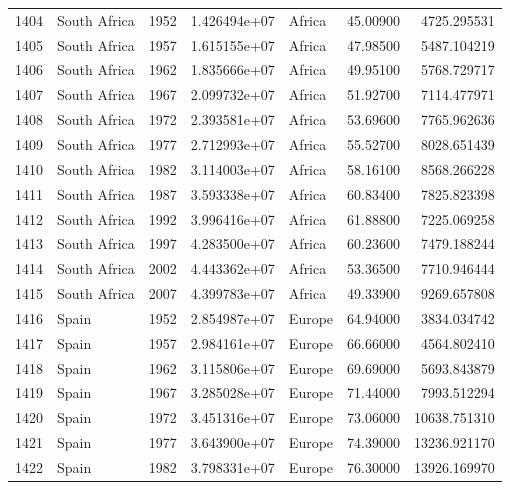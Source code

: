 \documentclass[
  letterpaper,
  DIV=11,
  numbers=noendperiod]{scrreprt}
\begin{document}
\begin{tabular}{llrrlrr}
1404 &              South Africa &  1952 &  1.426494e+07 &    Africa &  45.00900 &    4725.295531 \\
1405 &              South Africa &  1957 &  1.615155e+07 &    Africa &  47.98500 &    5487.104219 \\
1406 &              South Africa &  1962 &  1.835666e+07 &    Africa &  49.95100 &    5768.729717 \\
1407 &              South Africa &  1967 &  2.099732e+07 &    Africa &  51.92700 &    7114.477971 \\
1408 &              South Africa &  1972 &  2.393581e+07 &    Africa &  53.69600 &    7765.962636 \\
1409 &              South Africa &  1977 &  2.712993e+07 &    Africa &  55.52700 &    8028.651439 \\
1410 &              South Africa &  1982 &  3.114003e+07 &    Africa &  58.16100 &    8568.266228 \\
1411 &              South Africa &  1987 &  3.593338e+07 &    Africa &  60.83400 &    7825.823398 \\
1412 &              South Africa &  1992 &  3.996416e+07 &    Africa &  61.88800 &    7225.069258 \\
1413 &              South Africa &  1997 &  4.283500e+07 &    Africa &  60.23600 &    7479.188244 \\
1414 &              South Africa &  2002 &  4.443362e+07 &    Africa &  53.36500 &    7710.946444 \\
1415 &              South Africa &  2007 &  4.399783e+07 &    Africa &  49.33900 &    9269.657808 \\
1416 &                     Spain &  1952 &  2.854987e+07 &    Europe &  64.94000 &    3834.034742 \\
1417 &                     Spain &  1957 &  2.984161e+07 &    Europe &  66.66000 &    4564.802410 \\
1418 &                     Spain &  1962 &  3.115806e+07 &    Europe &  69.69000 &    5693.843879 \\
1419 &                     Spain &  1967 &  3.285028e+07 &    Europe &  71.44000 &    7993.512294 \\
1420 &                     Spain &  1972 &  3.451316e+07 &    Europe &  73.06000 &   10638.751310 \\
1421 &                     Spain &  1977 &  3.643900e+07 &    Europe &  74.39000 &   13236.921170 \\
1422 &                     Spain &  1982 &  3.798331e+07 &    Europe &  76.30000 &   13926.169970 \\

\end{tabular}
\end{document}
